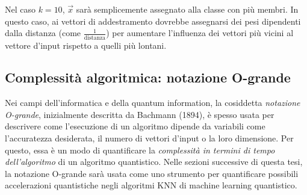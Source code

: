 Nel caso $k=10$, $\vec{x}$ sarà semplicemente assegnato alla classe con più 
membri. In questo caso, ai vettori di addestramento dovrebbe assegnarsi dei pesi 
dipendenti dalla distanza (come $\frac{1}{\text{distanza}}$) per aumentare 
l'influenza dei vettori più vicini al vettore d'input rispetto a quelli più 
lontani. 

\subsection{Complessità algoritmica: notazione O-grande}

Nei campi dell'informatica e della quantum information, la cosiddetta 
\emph{notazione O-grande}, inizialmente descritta da Bachmann (1894), 
è spesso usata per descrivere come l'esecuzione di un algoritmo dipende 
da variabili come l'accuratezza desiderata, il numero di vettori d'input o la 
loro dimensione. Per questo, essa è un modo di quantificare la \emph{complessità 
in termini di tempo dell'algoritmo} di un algoritmo quantistico. Nelle sezioni 
successive di questa tesi, la notazione O-grande sarà usata come uno strumento 
per quantificare possibili accelerazioni quantistiche negli algoritmi \ac{KNN} di 
machine learning quantistico. 


